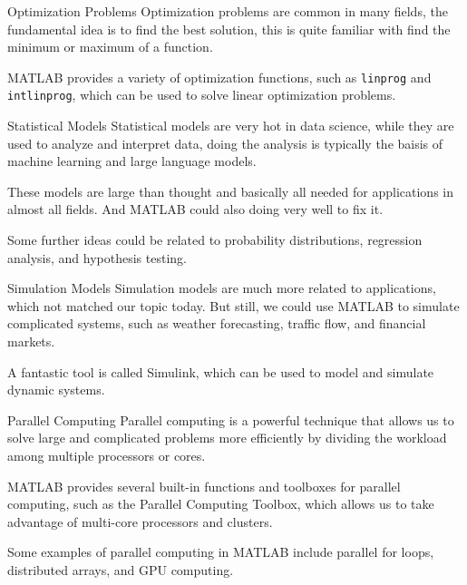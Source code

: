 \documentclass[aspectratio=169]{beamer}
\begin{document}
    \begin{frame}{Optimization Problems}
        Optimization problems are common in many fields, the fundamental idea is to find the best solution, this is quite familiar with find the minimum or maximum of a function.\par
        MATLAB provides a variety of optimization functions, such as \texttt{linprog} and \texttt{intlinprog}, which can be used to solve linear optimization problems.\par
    \end{frame}

    \begin{frame}{Statistical Models}
        Statistical models are very hot in data science, while they are used to analyze and interpret data, doing the analysis is typically the baisis of machine learning and large language models.\par
        These models are large than thought and basically all needed for applications in almost all fields. And MATLAB could also doing very well to fix it.\par
        Some further ideas could be related to probability distributions, regression analysis, and hypothesis testing.\par
    \end{frame}

    \begin{frame}{Simulation Models}
        Simulation models are much more related to applications, which not matched our topic today. But still, we could use MATLAB to simulate complicated systems, such as weather forecasting, traffic flow, and financial markets.\par
        A fantastic tool is called Simulink, which can be used to model and simulate dynamic systems.\par
    \end{frame}

    \begin{frame}{Parallel Computing}
        Parallel computing is a powerful technique that allows us to solve large and complicated problems more efficiently by dividing the workload among multiple processors or cores.\par
        MATLAB provides several built-in functions and toolboxes for parallel computing, such as the Parallel Computing Toolbox, which allows us to take advantage of multi-core processors and clusters.\par
        Some examples of parallel computing in MATLAB include parallel for loops, distributed arrays, and GPU computing.\par
    \end{frame}
\end{document}
